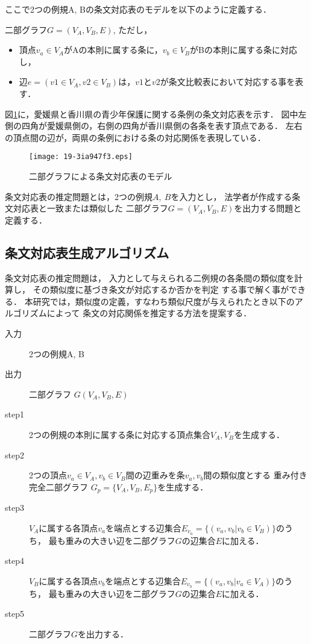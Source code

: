 \documentclass[japanese]{jnlp_1.4}
\begin{document}
ここで2つの例規A, Bの条文対応表のモデルを以下のように定義する．
\begin{description}
\item 二部グラフ$G=(V_A,V_B,E)$, ただし，
\begin{itemize}
\item 頂点$v_a \in V_A$がAの本則に属する条に，$v_b\in V_B$がBの本則に属する条に対応し，
\item 辺$e=(v1\in V_A,v2\in V_B)$は，$v1$と$v2$が条文比較表において対応する事を表す．
\end{itemize}
\end{description}
図\ref{taiouhyou}に，愛媛県と香川県の青少年保護に関する条例の条文対応表を示す．
図中左側の四角が愛媛県側の，右側の四角が香川県側の各条を表す頂点である．
左右の頂点間の辺が，両県の条例における条の対応関係を表現している．

\begin{figure}[t]
\begin{center}
\texttt{[image: 19-3ia947f3.eps]}
\end{center}
\caption{二部グラフによる条文対応表のモデル}
\label{taiouhyou}
\end{figure}

条文対応表の推定問題とは，2つの例規$A,\ B$を入力とし，
法学者が作成する条文対応表と一致または類似した
二部グラフ$G=(V_A,V_B,E)$を出力する問題と定義する．



\subsection{条文対応表生成アルゴリズム}
\label{algorithm}

条文対応表の推定問題は，
入力として与えられる二例規の各条間の類似度を計算し，
その類似度に基づき条文が対応するか否かを判定
する事で解く事ができる．
本研究では，類似度の定義，すなわち類似尺度が与えられたとき以下のアルゴリズムによって
条文の対応関係を推定する方法を提案する．

\begin{description}
\item[入力] 2つの例規A, B
\item[出力] 二部グラフ $G(V_A,V_B,E)$
\item[step1] 2つの例規の本則に属する条に対応する頂点集合$V_A,V_B$を生成する．
\item[step2] 2つの頂点$v_a\in V_A,v_b\in V_B$間の辺重みを条$v_a,v_b$間の類似度とする
重み付き完全二部グラフ $G_p=\{V_A,V_B,E_p\}$を生成する．
\item[step3] $V_A$に属する各頂点$v_a$を端点とする辺集合$E_{v_a}=\{(v_a,v_b| v_b \in V_B)\}$のうち，
最も重みの大きい辺を二部グラフ$G$の辺集合$E$に加える．
\item[step4] $V_B$に属する各頂点$v_b$を端点とする辺集合$E_{v_b}=\{(v_a,v_b| v_a \in V_A)\}$のうち，
最も重みの大きい辺を二部グラフ$G$の辺集合$E$に加える．
\item[step5] 二部グラフ$G$を出力する．
\end{description}
\end{document}
